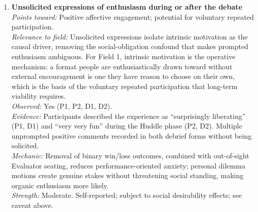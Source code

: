 \begin{enumerate}

\item \textbf{Unsolicited expressions of enthusiasm during or after the debate}\\
\textit{Points toward:} Positive affective engagement; potential for voluntary repeated participation.\\
\textit{Relevance to field:} Unsolicited expressions isolate intrinsic motivation as the causal driver, removing the social-obligation confound that makes prompted enthusiasm ambiguous. For Field 1, intrinsic motivation is the operative mechanism: a format people are enthusiastically drawn toward without external encouragement is one they have reason to choose on their own, which is the basis of the voluntary repeated participation that long-term viability requires.\\
\textit{Observed:} Yes (P1, P2, D1, D2).\\
\textit{Evidence:} Participants described the experience as ``surprisingly liberating'' (P1, D1) and ``very very fun'' during the Huddle phase (P2, D2). Multiple unprompted positive comments recorded in both debrief forms without being solicited.\\
\textit{Mechanic:} Removal of binary win/loss outcomes, combined with out-of-sight Evaluator seating, reduces performance-oriented anxiety; personal dilemma motions create genuine stakes without threatening social standing, making organic enthusiasm more likely.\\
\textit{Strength:} Moderate. Self-reported; subject to social desirability effects; see caveat above.


\end{enumerate}
